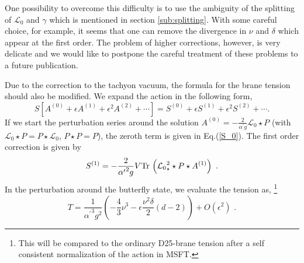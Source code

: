 \documentclass[a4paper,aps,preprint,nofootinbib,eqsecnum]{revtex4}
\begin{document}
One possibility to overcome this difficulty is to use the ambiguity of the
splitting of ${\mathcal{L}_{0}}$ and $\gamma $ which is mentioned in section
\ref{sub:splitting}.
With some careful choice, for example, it seems that one can remove
the divergence in $\nu $ and $\delta $ which appear at the first order. The
problem of higher corrections, however, is very delicate and we would like
to postpone the careful treatment of these problems to a future publication.

Due to the correction to the tachyon vacuum, the formula for the brane
tension should also be modified. We expand the action in the following form,
\begin{equation}
S[A^{\left( 0\right) }+\epsilon A^{\left( 1\right) }+\epsilon ^{2}A^{\left(
2\right) }+\cdots ]=S^{\left( 0\right) }+\epsilon S^{\left( 1\right)
}+\epsilon ^{2}S^{\left( 2\right) }+\cdots .
\end{equation}%
If we start the perturbation series around the solution $A^{\left( 0\right)
}=-\frac{2}{{\alpha ^{\prime }}g}{\mathcal{L}_{0}}\star P$ (with ${\mathcal{L%
}_{0}}\star P=P\star {\mathcal{L}_{0}}$, $P\star P=P$), the zeroth term is
given in Eq.(\ref{S_0}). The first order correction is given by
\begin{equation}
S^{\left( 1\right) }=-\frac{2}{{\alpha ^{\prime }}^2g}
V\mbox{Tr}\,\left( {%
\mathcal{L}_{0}}_{\star }^{2}\star P\star A^{\left( 1\right) }\right) \,\,.
\end{equation}%
In the perturbation around the butterfly state, we evaluate the tension as,%
\footnote{%
This will be compared to the ordinary D25-brane tension after a self
consistent normalization of the action in MSFT\cite{PREP}.}
\begin{equation}
T=\frac{1}{{\alpha ^{\prime }}^{3}g^{2}}\left( -\frac{4}{3}\nu ^{3}-\epsilon
\frac{\nu ^{2}\delta }{2}(d-2)\right) +O(\epsilon ^{2})\,\,.
\end{equation}
\end{document}
